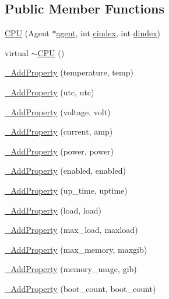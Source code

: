 \subsection*{Public Member Functions}
\begin{DoxyCompactItemize}
\item 
\hyperlink{classcubesat_1_1CPU_af4d1cfc8a8a5883e651d22c5da12bc23}{C\+PU} (Agent $\ast$\hyperlink{classcubesat_1_1Device_a8499108eccaf7375bea8ead0182391a6}{agent}, int \hyperlink{classcubesat_1_1Device_a1deca725b01f8ef37e49662da6db4e53}{cindex}, int \hyperlink{classcubesat_1_1Device_a8a2b3d6d7400e6796c31705058172982}{dindex})
\item 
virtual \hyperlink{classcubesat_1_1CPU_afb4d0426e2b66c2cee37b77256b9887c}{$\sim$\+C\+PU} ()
\item 
\hyperlink{classcubesat_1_1CPU_a3802b1fceaccca9c8f934c8913bafb45}{\+\_\+\+Add\+Property} (temperature, temp)
\item 
\hyperlink{classcubesat_1_1CPU_ab2bfa609208db1d82154958556295bd7}{\+\_\+\+Add\+Property} (utc, utc)
\item 
\hyperlink{classcubesat_1_1CPU_a3839c4adb3b7deee883e9eebb7dbabad}{\+\_\+\+Add\+Property} (voltage, volt)
\item 
\hyperlink{classcubesat_1_1CPU_a4c9c7a77cf05ac277a6f9f6cb4eb22b2}{\+\_\+\+Add\+Property} (current, amp)
\item 
\hyperlink{classcubesat_1_1CPU_a3663370bc4f9da2a493d3d1d66b892db}{\+\_\+\+Add\+Property} (power, power)
\item 
\hyperlink{classcubesat_1_1CPU_a40d2785d2983d97f9054b320aed84fb6}{\+\_\+\+Add\+Property} (enabled, enabled)
\item 
\hyperlink{classcubesat_1_1CPU_ab0f0b9d475b69dc603ec6242e9a3c074}{\+\_\+\+Add\+Property} (up\+\_\+time, uptime)
\item 
\hyperlink{classcubesat_1_1CPU_a7d1eae11f0dd0f5cffe7eb756ff33187}{\+\_\+\+Add\+Property} (load, load)
\item 
\hyperlink{classcubesat_1_1CPU_a74f8bced81fc233d90e485f1edcbe37b}{\+\_\+\+Add\+Property} (max\+\_\+load, maxload)
\item 
\hyperlink{classcubesat_1_1CPU_afdfc978336cfe4b2390d7f2520041761}{\+\_\+\+Add\+Property} (max\+\_\+memory, maxgib)
\item 
\hyperlink{classcubesat_1_1CPU_a087450dc4ceb02b01420e5a3b894bc95}{\+\_\+\+Add\+Property} (memory\+\_\+usage, gib)
\item 
\hyperlink{classcubesat_1_1CPU_a478fa66d93190e603a0ebfde468a2fb4}{\+\_\+\+Add\+Property} (boot\+\_\+count, boot\+\_\+count)
\end{DoxyCompactItemize}
